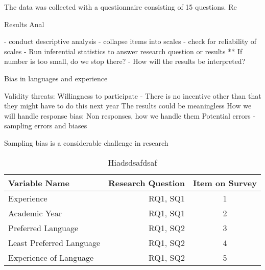 \documentclass[times, 10pt,twocolumn]{IEEEtran}
\begin{document}
The data was collected with a questionnaire consisting of 15 questions.
Re



Results Anal

- conduct descriptive analysis
- collapse items into scales
- check for reliability of scales
- Run inferential statistics to answer research question or results
** If number is too small, do we stop there?
- How will the results be interpreted?









Bias in languages and experience

  Validity threats:
    Willingness to participate - There is no incentive other than that they might have to do this next year
    The results could be meaningless
    How we will handle response bias:
      Non responses, how we handle them
  Potential errors - sampling errors and biases

  Sampling bias is a considerable challenge in research \cite{easterbrook2008selecting}






\begin{table}[ht]
  \centering
  \begin{tabular}{| l | r | c |}
  	\hline
  	\textbf{Variable Name} & \textbf{Research Question} & \textbf{Item on Survey} \\ \hline
  	Experience & RQ1, SQ1 & 1 \\ \hline
    Academic Year & RQ1, SQ1 & 2 \\ \hline
  	Preferred Language & RQ1, SQ2 & 3 \\ \hline
  	Least Preferred Language & RQ1, SQ2& 4 \\  \hline
  	Experience of Language & RQ1, SQ2 & 5 \\ 
  	\hline
	\end{tabular}
  \caption{ Hiadsdsafdsaf}
\end{table}
\end{document}

